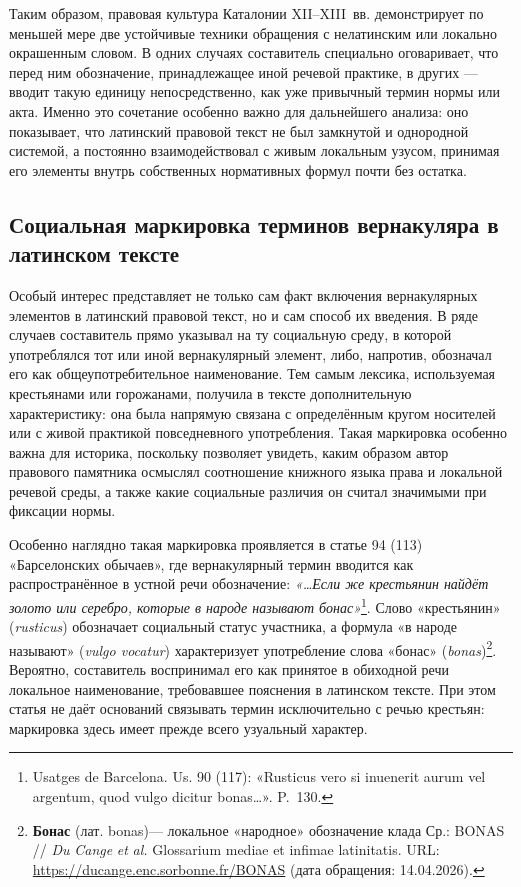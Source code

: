Таким образом, правовая культура Каталонии XII--XIII~вв. демонстрирует по меньшей мере две устойчивые техники обращения с нелатинским или локально окрашенным словом. В одних случаях составитель специально оговаривает, что перед ним обозначение, принадлежащее иной речевой практике, в других --- вводит такую единицу непосредственно, как уже привычный термин нормы или акта. Именно это сочетание особенно важно для дальнейшего анализа: оно показывает, что латинский правовой текст не был замкнутой и однородной системой, а постоянно взаимодействовал с живым локальным узусом, принимая его элементы внутрь собственных нормативных формул почти без остатка.

\subsection{Социальная маркировка терминов вернакуляра в латинском тексте}

Особый интерес представляет не только сам факт включения вернакулярных элементов в латинский правовой текст, но и сам способ их введения. В ряде случаев составитель прямо указывал на ту социальную среду, в которой употреблялся тот или иной вернакулярный элемент, либо, напротив, обозначал его как общеупотребительное наименование. Тем самым лексика, используемая крестьянами или горожанами, получила в тексте дополнительную характеристику: она была напрямую связана с определённым кругом носителей или с живой практикой повседневного употребления. Такая маркировка особенно важна для историка, поскольку позволяет увидеть, каким образом автор правового памятника осмыслял соотношение книжного языка права и локальной речевой среды, а также какие социальные различия он считал значимыми при фиксации нормы.

Особенно наглядно такая маркировка проявляется в статье 94 (113) «Барселонских обычаев», где вернакулярный термин вводится как распространённое в устной речи обозначение: \emph{«…Если же крестьянин найдёт золото или серебро, которые в народе называют бонас»}\footnote{Usatges de Barcelona. Us. 90 (117): «Rusticus vero si inuenerit aurum vel argentum, quod vulgo dicitur bonas…». P.~130.}. Слово «крестьянин» (\emph{rusticus}) обозначает социальный статус участника, а формула «в народе называют» (\emph{vulgo vocatur}) характеризует употребление слова «бонас» (\emph{bonas})\footnote{\textbf{Бонас }(лат. bonas)--- локальное «народное» обозначение клада Ср.: BONAS // \emph{Du}\emph{ }\emph{Cange}\emph{ }\emph{et}\emph{ }\emph{al}\emph{.} Glossarium mediae et infimae latinitatis. URL: \url{https://ducange.enc.sorbonne.fr/BONAS} (дата обращения: 14.04.2026).}. Вероятно, составитель воспринимал его как принятое в обиходной речи локальное наименование, требовавшее пояснения в латинском тексте. При этом статья не даёт оснований связывать термин исключительно с речью крестьян: маркировка здесь имеет прежде всего узуальный характер.

